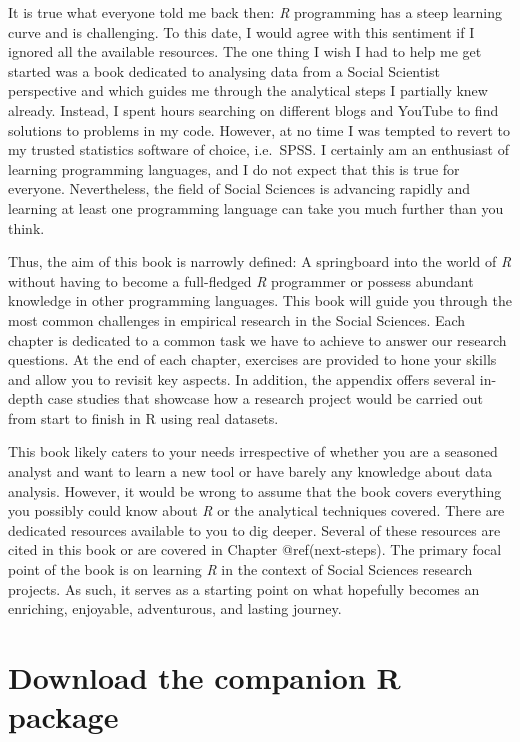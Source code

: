 \documentclass[
  letterpaper,
]{krantz}
\begin{document}
It is true what everyone told me back then: \emph{R} programming has a
steep learning curve and is challenging. To this date, I would agree
with this sentiment if I ignored all the available resources. The one
thing I wish I had to help me get started was a book dedicated to
analysing data from a Social Scientist perspective and which guides me
through the analytical steps I partially knew already. Instead, I spent
hours searching on different blogs and YouTube to find solutions to
problems in my code. However, at no time I was tempted to revert to my
trusted statistics software of choice, i.e.~SPSS. I certainly am an
enthusiast of learning programming languages, and I do not expect that
this is true for everyone. Nevertheless, the field of Social Sciences is
advancing rapidly and learning at least one programming language can
take you much further than you think.

Thus, the aim of this book is narrowly defined: A springboard into the
world of \emph{R} without having to become a full-fledged \emph{R}
programmer or possess abundant knowledge in other programming languages.
This book will guide you through the most common challenges in empirical
research in the Social Sciences. Each chapter is dedicated to a common
task we have to achieve to answer our research questions. At the end of
each chapter, exercises are provided to hone your skills and allow you
to revisit key aspects. In addition, the appendix offers several
in-depth case studies that showcase how a research project would be
carried out from start to finish in R using real datasets.

This book likely caters to your needs irrespective of whether you are a
seasoned analyst and want to learn a new tool or have barely any
knowledge about data analysis. However, it would be wrong to assume that
the book covers everything you possibly could know about \emph{R} or the
analytical techniques covered. There are dedicated resources available
to you to dig deeper. Several of these resources are cited in this book
or are covered in Chapter @ref(next-steps). The primary focal point of
the book is on learning \emph{R} in the context of Social Sciences
research projects. As such, it serves as a starting point on what
hopefully becomes an enriching, enjoyable, adventurous, and lasting
journey.

\section{Download the companion R
package}\label{download-the-companion-r-package}
\end{document}

